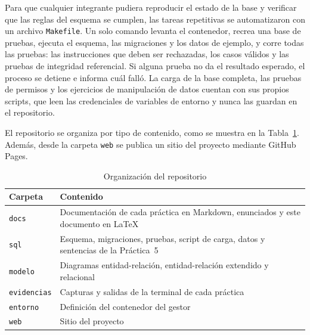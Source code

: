 Para que cualquier integrante pudiera reproducir el estado de la base y verificar que las reglas del esquema se cumplen, las tareas repetitivas se automatizaron con un archivo \texttt{Makefile}. Un solo comando levanta el contenedor, recrea una base de pruebas, ejecuta el esquema, las migraciones y los datos de ejemplo, y corre todas las pruebas: las instrucciones que deben ser rechazadas, los casos válidos y las pruebas de integridad referencial. Si alguna prueba no da el resultado esperado, el proceso se detiene e informa cuál falló. La carga de la base completa, las pruebas de permisos y los ejercicios de manipulación de datos cuentan con sus propios scripts, que leen las credenciales de variables de entorno y nunca las guardan en el repositorio.

El repositorio se organiza por tipo de contenido, como se muestra en la Tabla~\ref{tab:repositorio}. Además, desde la carpeta \texttt{web} se publica un sitio del proyecto mediante GitHub Pages.

\begin{table}[H]
    \centering
    \small
    \begin{tabularx}{\textwidth}
        {
            >{\RaggedRight\arraybackslash}p{3cm}
            >{\RaggedRight\arraybackslash}X
        }
        \toprule
        \textbf{Carpeta} & \textbf{Contenido} \\
        \midrule
        \texttt{docs} & Documentación de cada práctica en Markdown, enunciados y este documento en \LaTeX \\
        \texttt{sql} & Esquema, migraciones, pruebas, script de carga, datos y sentencias de la Práctica~5 \\
        \texttt{modelo} & Diagramas entidad-relación, entidad-relación extendido y relacional \\
        \texttt{evidencias} & Capturas y salidas de la terminal de cada práctica \\
        \texttt{entorno} & Definición del contenedor del gestor \\
        \texttt{web} & Sitio del proyecto \\
        \bottomrule
    \end{tabularx}
    \captionsetup{labelfont=bf, textfont=it, labelsep=newline, justification=raggedright, singlelinecheck=false}
    \caption{Organización del repositorio}
    \label{tab:repositorio}
\end{table}
